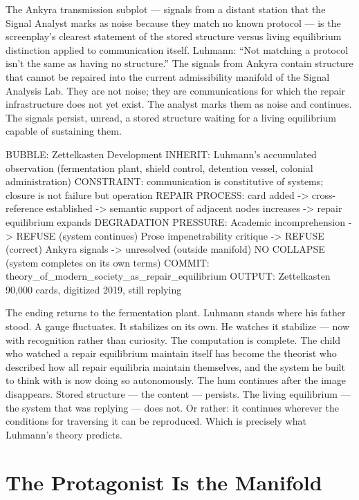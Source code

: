 \documentclass[11pt, a4paper]{article}
\theoremstyle{definition}
\theoremstyle{remark}
\begin{document}
The Ankyra transmission subplot --- signals from a distant station that the
Signal Analyst marks as noise because they match no known protocol --- is the
screenplay's clearest statement of the stored structure versus living
equilibrium distinction applied to communication itself. Luhmann: ``Not
matching a protocol isn't the same as having no structure.'' The signals from
Ankyra contain structure that cannot be repaired into the current admissibility
manifold of the Signal Analysis Lab. They are not noise; they are communications
for which the repair infrastructure does not yet exist. The analyst marks them
as noise and continues. The signals persist, unread, a stored structure waiting
for a living equilibrium capable of sustaining them.

\begin{SpherepopCode}
BUBBLE: Zettelkasten Development
  INHERIT: Luhmann's accumulated observation
           (fermentation plant, shield control,
            detention vessel, colonial administration)
  CONSTRAINT: communication is constitutive of systems;
              closure is not failure but operation
  REPAIR PROCESS: card added -> cross-reference established
                  -> semantic support of adjacent nodes
                     increases -> repair equilibrium
                     expands
  DEGRADATION PRESSURE:
    Academic incomprehension -> REFUSE (system continues)
    Prose impenetrability critique -> REFUSE (correct)
    Ankyra signals -> unresolved (outside manifold)
  NO COLLAPSE (system completes on its own terms)
  COMMIT: theory_of_modern_society_as_repair_equilibrium
OUTPUT: Zettelkasten 90,000 cards, digitized 2019,
        still replying
\end{SpherepopCode}

The ending returns to the fermentation plant. Luhmann stands where his father
stood. A gauge fluctuates. It stabilizes on its own. He watches it stabilize
--- now with recognition rather than curiosity. The computation is complete.
The child who watched a repair equilibrium maintain itself has become the
theorist who described how all repair equilibria maintain themselves, and the
system he built to think with is now doing so autonomously. The hum continues
after the image disappears. Stored structure --- the content --- persists.
The living equilibrium --- the system that was replying --- does not. Or
rather: it continues wherever the conditions for traversing it can be
reproduced. Which is precisely what Luhmann's theory predicts.

\section{The Protagonist Is the Manifold}
\end{document}
